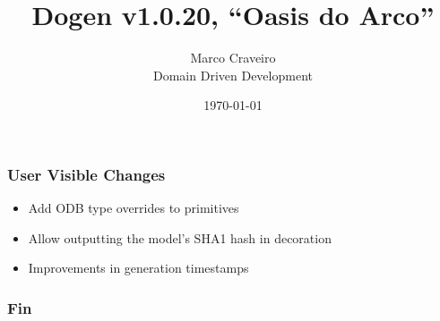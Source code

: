 \documentclass{beamer}
\title{Dogen v1.0.20, \enquote{Oasis do Arco}}
\author{Marco Craveiro \\
  Domain Driven Development
}
\date{\today}
\begin{document}
\begin{frame}
\titlepage{}
\end{frame}

\begin{frame}
\frametitle{User Visible Changes}

\begin{itemize}
  \pause{}
\item Add ODB type overrides to primitives
  \pause{}
\item Allow outputting the model's SHA1 hash in decoration
  \pause{}
\item Improvements in generation timestamps
  \pause{}
\end{itemize}

\end{frame}

\begin{frame}
\frametitle{Fin}
\end{frame}
\end{document}
